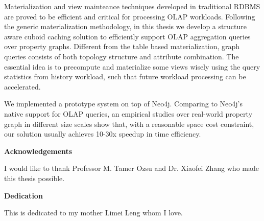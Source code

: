 Materialization and view mainteance techniques developed in traditional RDBMS are proved to be efficient and critical for processing OLAP workloads. Following the generic materialization methodology, in this thesis we develop a structure aware cuboid caching solution to efficiently support OLAP aggregation queries over property graphs. Different from the table based materialization, graph queries consists of both topology structure and attribute combination. The essential idea is to precompute and materialize some views wisely using the query statistics from history workload, such that future workload processing can be accelerated. %

We implemented a prototype system on top of Neo4j. Comparing to Neo4j's native support for OLAP queries, an empirical studies over real-world property graph in different size scales show that, with a reasonable space cost constraint, our solution usually achieves 10-30x speedup in time efficiency.


\cleardoublepage


\begin{center}\textbf{Acknowledgements}\end{center}

I would like to thank Professor M. Tamer {$\ddot{\mbox{O}}$}zsu and Dr. Xiaofei Zhang who made this thesis possible.
\cleardoublepage


\begin{center}\textbf{Dedication}\end{center}

This is dedicated to my mother Limei Leng whom I love.
\cleardoublepage

\renewcommand\contentsname{Table of Contents}
\tableofcontents
\cleardoublepage
{}    %

\listoftables
\cleardoublepage
{}		%

\listoffigures
\cleardoublepage
{}		%

\printglossaries
\cleardoublepage
{}		%


